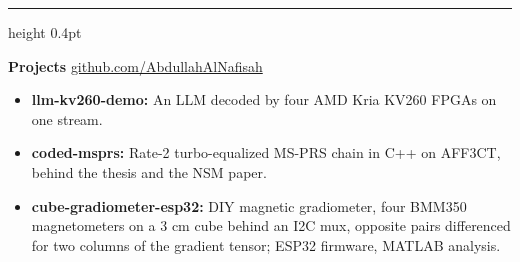 \documentclass[a4paper,10pt]{article}
\newcommand{\divider}{\par\vspace{2.2mm}\hrule height 0.4pt\vspace{1.6mm}\par\noindent}
\begin{document}

\divider
\noindent\textbf{Projects} \hfill \href{https://github.com/AbdullahAlNafisah}{github.com/AbdullahAlNafisah}
\begin{itemize}[left=0pt, label={--}]
    \item \textbf{llm-kv260-demo:} An LLM decoded by four AMD Kria KV260 FPGAs on one stream.
    \item \textbf{coded-msprs:} Rate-2 turbo-equalized MS-PRS chain in C++ on AFF3CT, behind the thesis and the NSM paper.
    \item \textbf{cube-gradiometer-esp32:} DIY magnetic gradiometer, four BMM350 magnetometers on a 3 cm cube behind an I2C mux, opposite pairs differenced for two columns of the gradient tensor; ESP32 firmware, MATLAB analysis.
\end{itemize}
\end{document}
